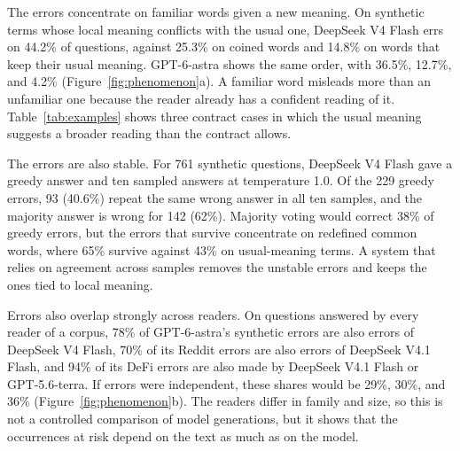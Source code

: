 The errors concentrate on familiar words given a new meaning. On synthetic terms whose local meaning conflicts with the usual one, DeepSeek V4 Flash errs on 44.2\% of questions, against 25.3\% on coined words and 14.8\% on words that keep their usual meaning. GPT-6-astra shows the same order, with 36.5\%, 12.7\%, and 4.2\% (Figure~\ref{fig:phenomenon}a). A familiar word misleads more than an unfamiliar one because the reader already has a confident reading of it. Table~\ref{tab:examples} shows three contract cases in which the usual meaning suggests a broader reading than the contract allows.

The errors are also stable. For 761 synthetic questions, DeepSeek V4 Flash gave a greedy answer and ten sampled answers at temperature 1.0. Of the 229 greedy errors, 93 (40.6\%) repeat the same wrong answer in all ten samples, and the majority answer is wrong for 142 (62\%). Majority voting would correct 38\% of greedy errors, but the errors that survive concentrate on redefined common words, where 65\% survive against 43\% on usual-meaning terms. A system that relies on agreement across samples \citep{self-consistency} removes the unstable errors and keeps the ones tied to local meaning.

Errors also overlap strongly across readers. On questions answered by every reader of a corpus, 78\% of GPT-6-astra's synthetic errors are also errors of DeepSeek V4 Flash, 70\% of its Reddit errors are also errors of DeepSeek V4.1 Flash, and 94\% of its DeFi errors are also made by DeepSeek V4.1 Flash or GPT-5.6-terra. If errors were independent, these shares would be 29\%, 30\%, and 36\% (Figure~\ref{fig:phenomenon}b). The readers differ in family and size, so this is not a controlled comparison of model generations, but it shows that the occurrences at risk depend on the text as much as on the model.
